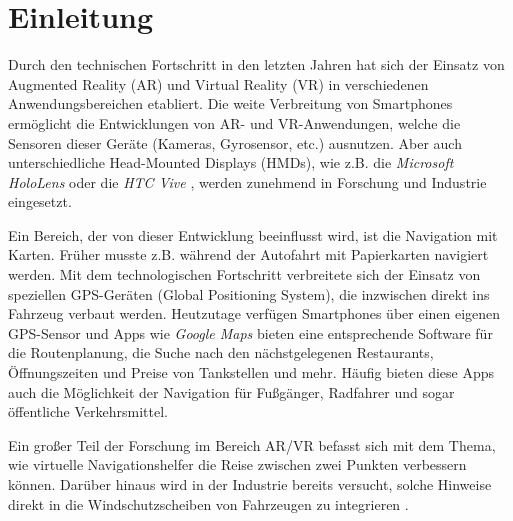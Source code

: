 \chapter{Einleitung}
\label{chap:einleitung}
Durch den technischen Fortschritt in den letzten Jahren hat sich der Einsatz von Augmented Reality (AR) und Virtual Reality (VR) in verschiedenen Anwendungsbereichen etabliert.
Die weite Verbreitung von Smartphones ermöglicht die Entwicklungen von AR- und VR-Anwendungen, welche die Sensoren dieser Geräte (Kameras, Gyrosensor, etc.) ausnutzen.
Aber auch unterschiedliche Head-Mounted Displays (HMDs), wie z.B. die \emph{Microsoft HoloLens} \parencite{Microsoft2018} oder die \emph{HTC Vive} \parencite{HTCCorporation2018}, werden zunehmend in Forschung und Industrie eingesetzt.

Ein Bereich, der von dieser Entwicklung beeinflusst wird, ist die Navigation mit Karten.
Früher musste z.B. während der Autofahrt mit Papierkarten navigiert werden.
Mit dem technologischen Fortschritt verbreitete sich der Einsatz von speziellen GPS-Geräten (Global Positioning System), die inzwischen direkt ins Fahrzeug verbaut werden.
Heutzutage verfügen Smartphones über einen eigenen GPS-Sensor und Apps wie \emph{Google Maps} \parencite{GoogleLLC2018} bieten eine entsprechende Software für die Routenplanung, die Suche nach den nächstgelegenen Restaurants, Öffnungszeiten und Preise von Tankstellen und mehr.
Häufig bieten diese Apps auch die Möglichkeit der Navigation für Fußgänger, Radfahrer und sogar öffentliche Verkehrsmittel.

Ein großer Teil der Forschung im Bereich AR/VR befasst sich mit dem Thema, wie virtuelle Navigationshelfer die Reise zwischen zwei Punkten verbessern können.
Darüber hinaus wird in der Industrie bereits versucht, solche Hinweise direkt in die Windschutzscheiben von Fahrzeugen zu integrieren \parencites{Cunningham2017}{Sygic2018}.

